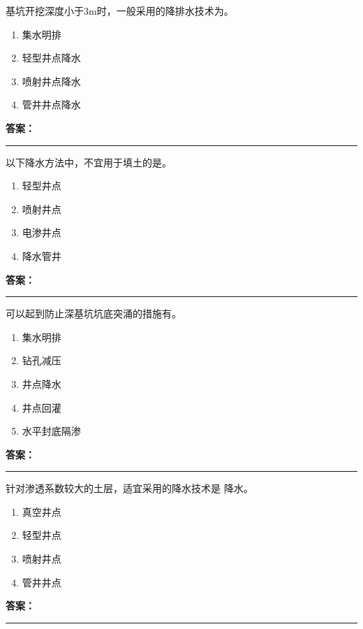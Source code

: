 \documentclass[UTF8,fontset=fandol,11pt]{ctexart}
\newcommand{\answerline}{\textcolor{answerred}{\rule{2.4cm}{0.7pt}}}
\begin{document}
\begin{quizbox}[title={第 12 题}]
基坑开挖深度小于3m时，一般采用的降排水技术为。\\
\begin{enumerate}[label=\Alph*.]
\item 集水明排
\item 轻型井点降水
\item 喷射井点降水
\item 管井井点降水
\end{enumerate}
\textbf{\textcolor{answerred}{答案：}} \answerline
\end{quizbox}

\begin{quizbox}[title={第 13 题}]
以下降水方法中，不宜用于填土的是。\\
\begin{enumerate}[label=\Alph*.]
\item 轻型井点
\item 喷射井点
\item 电渗井点
\item 降水管井
\end{enumerate}
\textbf{\textcolor{answerred}{答案：}} \answerline
\end{quizbox}

\begin{quizbox}[title={第 14 题}]
可以起到防止深基坑坑底突涌的措施有。\\
\begin{enumerate}[label=\Alph*.]
\item 集水明排
\item 钻孔减压
\item 井点降水
\item 井点回灌
\item 水平封底隔渗
\end{enumerate}
\textbf{\textcolor{answerred}{答案：}} \answerline
\end{quizbox}

\begin{quizbox}[title={第 15 题}]
针对渗透系数较大的土层，适宜采用的降水技术是 降水。\\
\begin{enumerate}[label=\Alph*.]
\item 真空井点
\item 轻型井点
\item 喷射井点
\item 管井井点
\end{enumerate}
\textbf{\textcolor{answerred}{答案：}} \answerline
\end{quizbox}
\end{document}
